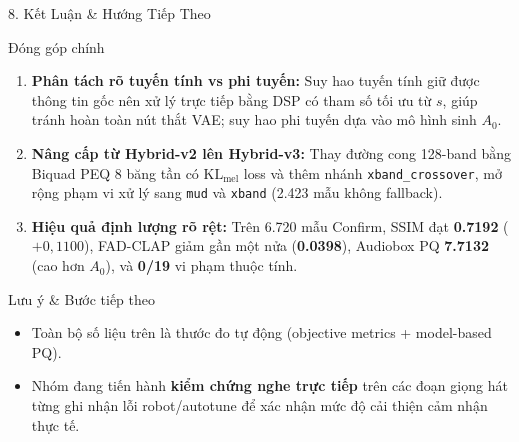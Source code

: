 \documentclass[aspectratio=169,10pt]{beamer}
\begin{document}
\begin{frame}{8. Kết Luận \& Hướng Tiếp Theo}
  \footnotesize
  \begin{block}{Đóng góp chính}
    \begin{enumerate}
      \item \textbf{Phân tách rõ tuyến tính vs phi tuyến:} Suy hao tuyến tính giữ được thông tin gốc nên xử lý trực tiếp bằng DSP có tham số tối ưu từ $s$, giúp tránh hoàn toàn nút thắt VAE; suy hao phi tuyến dựa vào mô hình sinh $A_0$.
      \item \textbf{Nâng cấp từ Hybrid-v2 lên Hybrid-v3:} Thay đường cong 128-band bằng Biquad PEQ 8 băng tần có $\text{KL}_{\text{mel}}$ loss và thêm nhánh \texttt{xband\_crossover}, mở rộng phạm vi xử lý sang \texttt{mud} và \texttt{xband} (2.423 mẫu không fallback).
      \item \textbf{Hiệu quả định lượng rõ rệt:} Trên 6.720 mẫu Confirm, SSIM đạt \textbf{0.7192} ($+0{,}1100$), FAD-CLAP giảm gần một nửa (\textbf{0.0398}), Audiobox PQ \textbf{7.7132} (cao hơn $A_0$), và \textbf{0/19} vi phạm thuộc tính.
    \end{enumerate}
  \end{block}
  \begin{alertblock}{Lưu ý \& Bước tiếp theo}
    \begin{itemize}
      \item Toàn bộ số liệu trên là thước đo tự động (objective metrics + model-based PQ).
      \item Nhóm đang tiến hành \textbf{kiểm chứng nghe trực tiếp} trên các đoạn giọng hát từng ghi nhận lỗi robot/autotune để xác nhận mức độ cải thiện cảm nhận thực tế.
    \end{itemize}
  \end{alertblock}
\end{frame}
\end{document}

